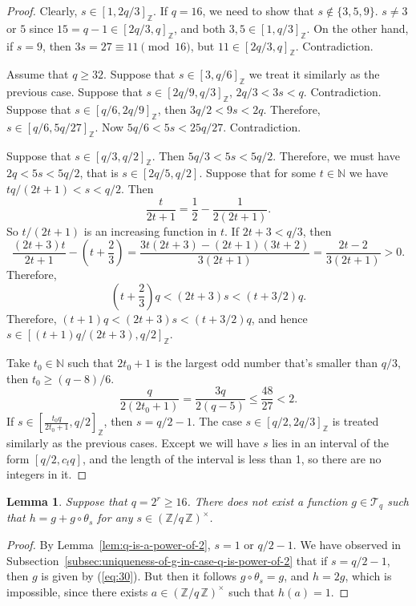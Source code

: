 \documentclass{amsart}[11pt]
\newtheorem{lem}[thm]{Lemma}
\theoremstyle{definition}
\numberwithin{equation}{section}
\theoremstyle{notitle}
\begin{document}
\begin{proof}
Clearly, $s\in [1, 2q/3]_{\mathbb{Z}}$. If $q=16$, we need to show that $s\not
\in \{ 3, 5, 9\}$.  $s\neq 3$ or $5$ since $15=q-1\in [2q/3, q]_{\mathbb{Z}}$,
and both $3, 5\in [1, q/3]_{\mathbb{Z}}$. On the other hand, if $s=9$, then
$3s=27\equiv 11 \pmod{16}$, but $11\in [2q/3, q]_{\mathbb{Z}}$. Contradiction. 

Assume that $q\geq 32$.  Suppose that $s\in [3, q/6]_{\mathbb{Z}}$ we treat it
similarly as the previous case.  Suppose that $s\in [2q/9, q/3]_{\mathbb{Z}}$,
$2q/3< 3s <q$. Contradiction.  Suppose that $s\in [q/6, 2q/9]_{\mathbb{Z}}$, then
$3q/2< 9s < 2q$. Therefore, $s\in [q/6, 5q/27]_{\mathbb{Z}}$.  Now $5q/6< 5s <
25q/27$. Contradiction.

Suppose that $s\in [q/3, q/2]_{\mathbb{Z}}$. Then $5q/3 < 5s <
5q/2$. Therefore, we must have $ 2q<5s< 5q/2$, that is $s\in [2q/5,
q/2]$. Suppose that for some $t\in {\mathbb{N}}$ we have $tq/(2t+1)< s < q/2$. Then 
\[ \frac{t}{2t+1}= \frac{1}{2}- \frac{1}{2(2t+1)}.\]
So $t/(2t+1)$ is an increasing function in $t$. 
If $2t+3<q/3$, then 
\[  \frac{(2t+3)t}{2t+1}- (t+\frac{2}{3}) =
\frac{3t(2t+3)-(2t+1)(3t+2)}{3(2t+1)}= \frac{2t-2 }{3(2t+1)}>0.\] 
Therefore, 
\[ (t+ \frac{2}{3})q <  (2t+3)s < (t+3/2)q.\]
Therefore, $   (t+1)q< (2t+3)s < (t+3/2)q$, and hence $s\in
[(t+1)q/(2t+3), q/2]_{\mathbb{Z}}$. 

Take $t_0\in {\mathbb{N}}$ such that $2t_0+1$ is the largest odd number that's
smaller than $q/3$, then $t_0\geq (q-8)/6$. 
\[ \frac{q}{2(2t_0+1)} =\frac{3q}{2(q-5)}\leq \frac{48}{27}<2.\]
If $s\in [\frac{t_0q}{2t_0+1}, q/2]_{\mathbb{Z}}$, then $s=q/2-1$. 
The case $s\in [q/2, 2q/3]_{\mathbb{Z}}$ is treated similarly as the previous
cases. Except we will have $s$ lies in an interval of the form $[q/2,
c_tq]$, and the length of the interval is less than 1, so there are no
integers in it. 
\end{proof}

\begin{lem}\label{lem:not-isogenous-q-is-power-of-2}
  Suppose that $q=2^r\geq 16$. There does not exist a function
  $g\in {\mathscr{T}}_q$ such that $h= g+ g\circ\theta_s$ for any $s\in
  {(\mathbb{Z}/ {q}\, \mathbb{Z})^\times}$. 
  
  
  
\end{lem}
\begin{proof}
  By Lemma~\ref{lem:q-is-a-power-of-2}, $s=1$ or $q/2-1$. We have
  observed in
  Subsection~\ref{subsec:uniqueness-of-g-in-case-q-is-power-of-2} that
  if $s=q/2-1$, then $g$ is given by (\ref{eq:30}).  But then it
  follows $g\circ \theta_s=g$, and $h=2g$, which is impossible, since
  there exists $a\in {(\mathbb{Z}/ {q}\, \mathbb{Z})^\times}$ such that $h(a)=1$.
\end{proof}
\end{document}
